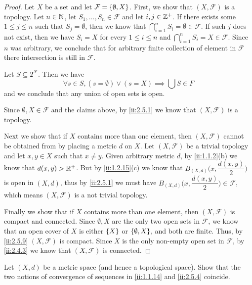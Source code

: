 \begin{proof}
  Let \(X\) be a set and let \(\mathcal{F} = \left\lbrace\emptyset, X\right\rbrace\).
  First, we show that \((X, \mathcal{F})\) is a topology.
  Let \(n \in \mathbb{N}\), let \(S_1, \dots, S_n \in \mathcal{F}\) and let \(i, j \in \mathbb{Z}^+\).
  If there exists some \(1 \leq j \leq n\) such that \(S_j = \emptyset\), then we know that \(\bigcap_{i = 1}^n S_i = \emptyset \in \mathcal{F}\).
  If such \(j\) does not exist, then we have \(S_i = X\) for every \(1 \leq i \leq n\) and \(\bigcap_{i = 1}^n S_i = X \in \mathcal{F}\).
  Since \(n\) was arbitrary, we conclude that for arbitrary finite collection of element in \(\mathcal{F}\) there intersection is still in \(\mathcal{F}\).

  Let \(S \subseteq 2^{\mathcal{F}}\).
  Then we have
  \[
    \forall s \in S, (s = \emptyset) \lor (s = X) \implies \bigcup S \in F
  \]
  and we conclude that any union of open sets is open.

  Since \(\emptyset, X \in \mathcal{F}\) and the claims above, by \cref{ii:2.5.1} we know that \((X, \mathcal{F})\) is a topology.

  Next we show that if \(X\) contains more than one element, then \((X, \mathcal{F})\) cannot be obtained from by placing a metric \(d\) on \(X\).
  Let \((X, \mathcal{F})\) be a trivial topology and let \(x, y \in X\) such that \(x \neq y\).
  Given arbitrary metric \(d\), by \cref{ii:1.1.2}(b) we know that \(d(x, y) > \mathbb{R}^+\).
  But by \cref{ii:1.2.15}(c) we know that \(B_{(X, d)}\big(x, \dfrac{d(x, y)}{2}\big)\) is open in \((X, d)\), thus by \cref{ii:2.5.1} we must have \(B_{(X, d)}\big(x, \dfrac{d(x, y)}{2}\big) \in \mathcal{F}\), which means \((X, \mathcal{F})\) is a not trivial topology.

  Finally we show that if \(X\) contains more than one element, then \((X, \mathcal{F})\) is compact and connected.
  Since \(\emptyset, X\) are the only two open sets in \(\mathcal{F}\), we know that an open cover of \(X\) is either \(\left\lbrace X\right\rbrace\) or \(\left\lbrace\emptyset, X\right\rbrace\), and both are finite.
  Thus, by \cref{ii:2.5.9} \((X, \mathcal{F})\) is compact.
  Since \(X\) is the only non-empty open set in \(\mathcal{F}\), by \cref{ii:2.4.3} we know that \((X, \mathcal{F})\) is connected.
\end{proof}

\begin{ex}\label{ii:ex:2.5.2}
  Let \((X, d)\) be a metric space
  (and hence a topological space).
  Show that the two notions of convergence of sequences in \cref{ii:1.1.14} and \cref{ii:2.5.4} coincide.
\end{ex}


